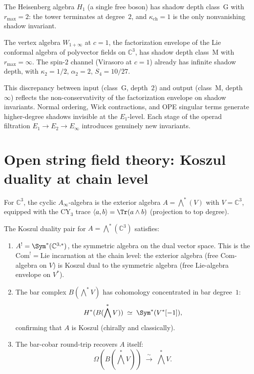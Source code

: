 \begin{remark}
\label{rem:envelope-depth-jump}
The Heisenberg algebra $H_1$ (a single free boson) has shadow depth class~G with $r_{\max} = 2$: the tower terminates at degree~$2$, and $\kappa_{\mathrm{ch}} = 1$ is the only nonvanishing shadow invariant.

The vertex algebra $W_{1+\infty}$ at $c = 1$, the factorization envelope of the Lie conformal algebra of polyvector fields on $\mathbb{C}^3$, has shadow depth class~M with $r_{\max} = \infty$. The spin-$2$ channel (Virasoro at $c = 1$) already has infinite shadow depth, with $\kappa_2 = 1/2$, $\alpha_2 = 2$, $S_4 = 10/27$.

This discrepancy between input (class~G, depth~$2$) and output (class~M, depth~$\infty$) reflects the non-conservativity of the factorization envelope on shadow invariants. Normal ordering, Wick contractions, and OPE singular terms generate higher-degree shadows invisible at the $E_1$-level. Each stage of the operad filtration $E_1 \to E_2 \to E_\infty$ introduces genuinely new invariants.
\end{remark}



\section{Open string field theory: Koszul duality at chain level}
\label{sec:open-sft-koszul}

For $\mathbb{C}^3$, the cyclic $A_\infty$-algebra is the exterior algebra $A = \bigwedge^*(V)$ with $V = \mathbb{C}^3$, equipped with the CY$_3$ trace $\langle a, b \rangle = \Tr(a \wedge b)$ (projection to top degree).

\begin{theorem}
\label{thm:c3-koszul-chain-level}
The Koszul duality pair for $A = \bigwedge^*(\mathbb{C}^3)$ satisfies:
\begin{enumerate}[label=(\roman*)]
 \item $A^! = \Sym^*(\mathbb{C}^{3,*})$, the symmetric algebra on the dual vector space. This is the $\mathrm{Com}^! = \mathrm{Lie}$ incarnation at the chain level: the exterior algebra (free $\mathrm{Com}$-algebra on $V$) is Koszul dual to the symmetric algebra (free $\mathrm{Lie}$-algebra envelope on $V^*$).
 \item The bar complex $B(\bigwedge^* V)$ has cohomology concentrated in bar degree~$1$:
 \[
 H^*(B(\bigwedge^* V)) \;\simeq\; \Sym^*(V^*[-1]),
 \]
 confirming that $A$ is Koszul (chirally and classically).
 \item The bar-cobar round-trip recovers $A$ itself:
 \[
 \Omega(B(\bigwedge^* V)) \;\xrightarrow{\;\sim\;}\; \bigwedge^* V.
 \]
\end{enumerate}
\end{theorem}


